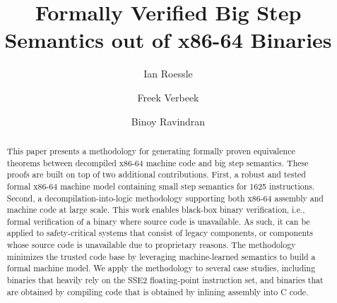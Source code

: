 \documentclass[sigplan,10pt, review]{acmart}\settopmatter{printfolios=true,printccs=false,printacmref=false}
\begin{document}
\title{Formally Verified Big Step Semantics out of x86-64 Binaries}

\author{Ian Roessle}
\author{Freek Verbeek}
\author{Binoy Ravindran}


\begin{abstract}
This paper presents a methodology for generating formally proven equivalence theorems between decompiled x86-64 machine code and big step semantics. 
These proofs are built on top of two additional contributions. 
First, a robust and tested formal x86-64 machine model containing small step semantics for 1625 instructions.
Second, a decompilation-into-logic methodology supporting both x86-64 assembly and machine code at large scale.
This work enables black-box binary verification, i.e., formal verification of a binary where source code is unavailable.
As such, it can be applied to safety-critical systems that consist of legacy components, or components whose source code is unavailable due to proprietary reasons.
The methodology minimizes the trusted code base by leveraging machine-learned semantics to build a formal machine model.
We apply the methodology to several case studies, including binaries that heavily rely on the SSE2 floating-point instruction set, and binaries that are obtained by compiling code that is obtained by inlining assembly into C code.
\end{abstract}
\end{document}
